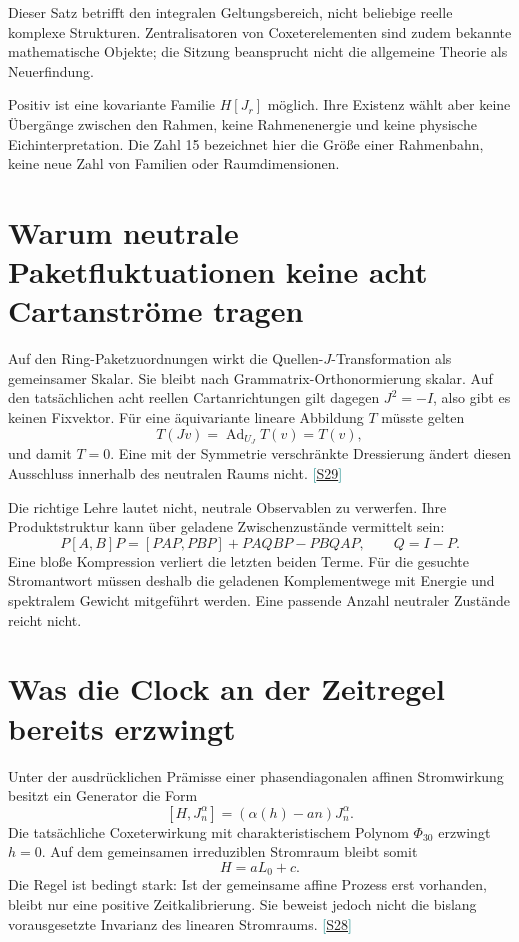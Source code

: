 \documentclass[11pt,a4paper,oneside,parskip=half,headings=normal,numbers=noenddot,bibliography=totoc]{scrreprt}
\newcommand{\src}[1]{\textcolor{teal}{\small[\hyperref[s:#1]{S#1}]}}
\begin{document}
Dieser Satz betrifft den integralen Geltungsbereich, nicht beliebige reelle komplexe Strukturen. Zentralisatoren von Coxeterelementen sind zudem bekannte mathematische Objekte; die Sitzung beansprucht nicht die allgemeine Theorie als Neuerfindung. \cite{coxeter}

Positiv ist eine kovariante Familie $H[J_r]$ möglich. Ihre Existenz wählt aber keine Übergänge zwischen den Rahmen, keine Rahmenenergie und keine physische Eichinterpretation. Die Zahl 15 bezeichnet hier die Größe einer Rahmenbahn, keine neue Zahl von Familien oder Raumdimensionen.

\section{Warum neutrale Paketfluktuationen keine acht Cartanströme tragen}
Auf den Ring-Paketzuordnungen wirkt die Quellen-$J$-Transformation als gemeinsamer Skalar. Sie bleibt nach Grammatrix-Orthonormierung skalar. Auf den tatsächlichen acht reellen Cartanrichtungen gilt dagegen $J^2=-I$, also gibt es keinen Fixvektor. Für eine äquivariante lineare Abbildung $T$ müsste gelten
\[
 T(Jv)=\operatorname{Ad}_{U_J}T(v)=T(v),
\]
und damit $T=0$. Eine mit der Symmetrie verschränkte Dressierung ändert diesen Ausschluss innerhalb des neutralen Raums nicht. \src{29}

Die richtige Lehre lautet nicht, neutrale Observablen zu verwerfen. Ihre Produktstruktur kann über geladene Zwischenzustände vermittelt sein:
\[
 P[A,B]P=[PAP,PBP]+PAQBP-PBQAP,\qquad Q=I-P.
\]
Eine bloße Kompression verliert die letzten beiden Terme. Für die gesuchte Stromantwort müssen deshalb die geladenen Komplementwege mit Energie und spektralem Gewicht mitgeführt werden. Eine passende Anzahl neutraler Zustände reicht nicht.

\section{Was die Clock an der Zeitregel bereits erzwingt}
Unter der ausdrücklichen Prämisse einer phasendiagonalen affinen Stromwirkung besitzt ein Generator die Form
\[
 [H,J_n^\alpha]=(\alpha(h)-an)J_n^\alpha.
\]
Die tatsächliche Coxeterwirkung mit charakteristischem Polynom $\Phi_{30}$ erzwingt $h=0$. Auf dem gemeinsamen irreduziblen Stromraum bleibt somit
\[
 H=aL_0+c.
\]
Die Regel ist bedingt stark: Ist der gemeinsame affine Prozess erst vorhanden, bleibt nur eine positive Zeitkalibrierung. Sie beweist jedoch nicht die bislang vorausgesetzte Invarianz des linearen Stromraums. \src{28}
\end{document}
